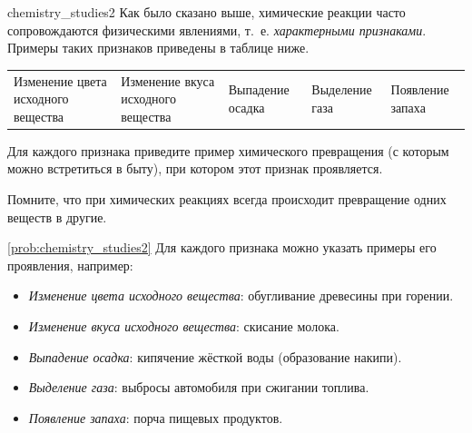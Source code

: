 \begin{problem}{}{chemistry_studies2}
    Как было сказано выше, химические реакции часто сопровождаются физическими явлениями, т.~е. \emph{характерными признаками}\label{term:signs_of_a_chemical_reaction}. Примеры таких признаков приведены в таблице ниже.

    \vspace{5pt}
    \begin{small}
    \begin{tabularx}{\textwidth}{|Y|Y|Y|Y|Y|}
        \hline
         \\
        \hline
        Изменение цвета исходного вещества &
        Изменение вкуса исходного вещества &
        Выпадение осадка &
        Выделение газа &
        Появление запаха \\
        \hline
    \end{tabularx}
    \end{small}
    \vspace{5pt}

    Для каждого признака приведите пример химического превращения (с которым можно встретиться в быту), при котором этот признак проявляется.

    \medskip

    Помните, что при химических реакциях всегда происходит превращение одних веществ в другие.

    \begin{sol}{\ref{prob:chemistry_studies2}}
        Для каждого признака можно указать примеры его проявления, например:
        \begin{itemize}
            \item \textit{Изменение цвета исходного вещества}: обугливание древесины при горении.
            \item \textit{Изменение вкуса исходного вещества}: скисание молока.
            \item \textit{Выпадение осадка}: кипячение жёсткой воды (образование накипи).
            \item \textit{Выделение газа}: выбросы автомобиля при сжигании топлива.
            \item \textit{Появление запаха}: порча пищевых продуктов.
        \end{itemize}
    \end{sol}
\end{problem}

